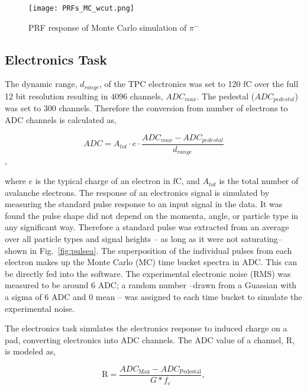 \begin{figure}[!htb]
         \centering
         \texttt{[image: PRFs\_MC\_wcut.png]}
         \caption{PRF response of Monte Carlo simulation of $\pi^-$}
         \label{fig:prfpimMC}
\end{figure}



\subsection{Electronics Task}
The dynamic range, $d_{range}$, of the TPC electronics was set to 120 $\si{\femto \coulomb}$ over the full 12 bit resolution resulting in 4096 channels, $ADC_{max}$. The pedestal ($ADC_{pedestal}$) was set to 300 channels. Therefore the conversion from number of electrons to ADC channels is calculated as, 

\begin{equation}
ADC = A_{tot} \cdot e \cdot\frac{ADC_{max} - ADC_{pedestal}}{d_{range}}
\end{equation},

where $e$ is the typical charge of an electron in $\si{\femto \coulomb}$, and $A_{tot}$ is the total number of avalanche electrons. The response of an electronics signal is simulated by measuring the standard pulse response to an input signal in the data. It was found the pulse shape did not depend on the momenta, angle, or particle type in any significant way. Therefore a standard pulse was extracted from an average over all particle types and signal heights -- as long as it were not saturating-- shown in Fig.~\ref{fig:pulsea}. The superposition of the individual pulses from each electron makes up the Monte Carlo (MC) time bucket spectra in ADC. This can be directly fed into the software. The experimental electronic noise (RMS) was measured to be around 6 ADC; a random number --drawn from a Guassian with a sigma of 6 ADC and 0 mean -- was assigned to each time bucket to simulate the experimental noise. 









The electronics task simulates the electronics response to induced charge on a pad, converting electronics into ADC channels.
The ADC value of a channel, R, is modeled as, 


\begin{equation}
\mathrm{R}= \frac{ADC_{\mathrm{Max}} - ADC_{\mathrm{Pedestal}}}{G*f_c},
\label{eq:etoADC}
\end{equation}

